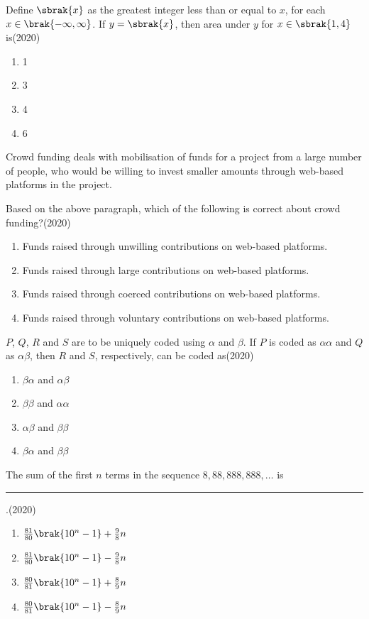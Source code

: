 \item Define $\sbrak{x}$ as the greatest integer less than or equal to $x$, for each $x\in \brak{-\infty,\infty}$. If $y=\sbrak{x}$, then area under $y$ for $x\in\sbrak{1,4}$ is\hfill(2020)
\begin{multicols}{2}
\begin{enumerate}
\item 1
\item 3
\item 4
\item 6
\end{enumerate}
\end{multicols}


\item Crowd funding deals with mobilisation of funds for a project from a large number of people, who would be willing to invest smaller amounts through web-based platforms in the project.

Based on the above paragraph, which of the following is correct about crowd funding?\hfill(2020)
\begin{enumerate}
\item Funds raised through unwilling contributions on web-based platforms.
\item Funds raised through large contributions on web-based platforms.
\item Funds raised through coerced contributions on web-based platforms.
\item Funds raised through voluntary contributions on web-based platforms.
\end{enumerate}


\item $P$, $Q$, $R$ and $S$ are to be uniquely coded using $\alpha$ and $\beta$. If $P$ is coded as $\alpha\alpha$ and $Q$ as $\alpha\beta$, then $R$ and $S$, respectively, can be coded as\hfill(2020)
\begin{multicols}{2}
\begin{enumerate}
\item $\beta\alpha$ and $\alpha\beta$
\item $\beta\beta$ and $\alpha\alpha$
\item $\alpha\beta$ and $\beta\beta$
\item $\beta\alpha$ and $\beta\beta$
\end{enumerate}
\end{multicols}


\item The sum of the first $n$ terms in the sequence $8,88,888,888,\dots$ is \rule{1cm}{0.15mm}.\hfill(2020)
\begin{multicols}{2}
\begin{enumerate}
\item $\frac{81}{80}\brak{10^{n}-1}+\frac{9}{8}n$
\item $\frac{81}{80}\brak{10^{n}-1}-\frac{9}{8}n$
\item $\frac{80}{81}\brak{10^{n}-1}+\frac{8}{9}n$
\item $\frac{80}{81}\brak{10^{n}-1}-\frac{8}{9}n$
\end{enumerate}
\end{multicols}


